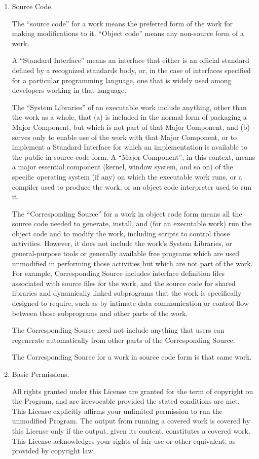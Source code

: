\documentclass[a4paper,twocolumn]{article}
\begin{document}
\begin{enumerate}
\item Source Code.

The ``source code'' for a work means the preferred form of the work
for making modifications to it.  ``Object code'' means any non-source
form of a work.

A ``Standard Interface'' means an interface that either is an official
standard defined by a recognized standards body, or, in the case of
interfaces specified for a particular programming language, one that
is widely used among developers working in that language.

The ``System Libraries'' of an executable work include anything, other
than the work as a whole, that (a) is included in the normal form of
packaging a Major Component, but which is not part of that Major
Component, and (b) serves only to enable use of the work with that
Major Component, or to implement a Standard Interface for which an
implementation is available to the public in source code form.  A
``Major Component'', in this context, means a major essential component
(kernel, window system, and so on) of the specific operating system
(if any) on which the executable work runs, or a compiler used to
produce the work, or an object code interpreter used to run it.

The ``Corresponding Source'' for a work in object code form means all
the source code needed to generate, install, and (for an executable
work) run the object code and to modify the work, including scripts to
control those activities.  However, it does not include the work's
System Libraries, or general-purpose tools or generally available free
programs which are used unmodified in performing those activities but
which are not part of the work.  For example, Corresponding Source
includes interface definition files associated with source files for
the work, and the source code for shared libraries and dynamically
linked subprograms that the work is specifically designed to require,
such as by intimate data communication or control flow between those
subprograms and other parts of the work.

The Corresponding Source need not include anything that users
can regenerate automatically from other parts of the Corresponding
Source.

The Corresponding Source for a work in source code form is that
same work.

\item Basic Permissions.

All rights granted under this License are granted for the term of
copyright on the Program, and are irrevocable provided the stated
conditions are met.  This License explicitly affirms your unlimited
permission to run the unmodified Program.  The output from running a
covered work is covered by this License only if the output, given its
content, constitutes a covered work.  This License acknowledges your
rights of fair use or other equivalent, as provided by copyright law.


\end{enumerate}
\end{document}
